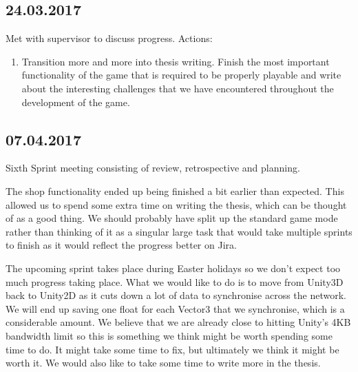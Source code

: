 \subsection*{24.03.2017}
Met with supervisor to discuss progress. Actions:
\begin{enumerate}
    \item Transition more and more into thesis writing. Finish the most important functionality of the game that is required to be properly playable and write about the interesting challenges that we have encountered throughout the development of the game. 
\end{enumerate}

\subsection*{07.04.2017}
Sixth Sprint meeting consisting of review, retrospective and planning.

The shop functionality ended up being finished a bit earlier than expected. This allowed us to spend some extra time on writing the thesis, which can be thought of as a good thing.
We should probably have split up the standard game mode rather than thinking of it as a singular large task that would take multiple sprints to finish as it would reflect the progress better on Jira. 

The upcoming sprint takes place during Easter holidays so we don't expect too much progress taking place. What we would like to do is to move from Unity3D back to Unity2D as it cuts down a lot of data to synchronise across the network. We will end up saving one float for each Vector3 that we synchronise, which is a considerable amount. We believe that we are already close to hitting Unity's 4KB bandwidth limit so this is something we think might be worth spending some time to do. It might take some time to fix, but ultimately we think it might be worth it.
We would also like to take some time to write more in the thesis. 